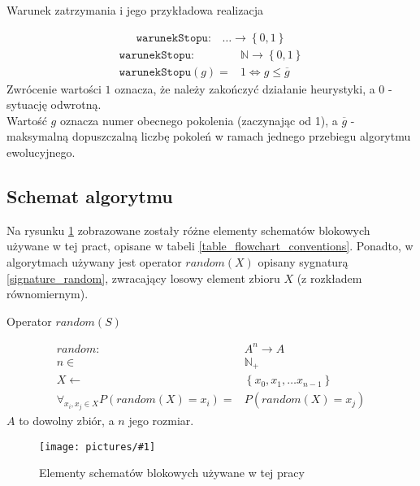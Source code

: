 \documentclass[twoside]{iisthesis}
\newcommand{\numberSet}{\mathbb}
\newcommand{\param}{\mathtt}
\newcommand{\img}[1]{\texttt{[image: pictures/\#1]}}
\begin{document}
\begin{signature}
	\caption{Warunek zatrzymania i jego przykładowa realizacja \label{signature_stop}} 
	\begin{align}
		\label{stop_general}
		\param{warunekStopu}: &\ldots \rightarrow \left\{ 0, 1 \right\}
	\end{align}
	\begin{align}
		\label{stop_maxGen}
		\param{warunekStopu}: &\numberSet{N} \rightarrow \left\{ 0, 1 \right\} \\
		\param{warunekStopu}(g) = &1 \Leftrightarrow g \leq \overline{g}
	\end{align}
	Zwrócenie wartości $1$ oznacza, że należy zakończyć działanie heurystyki, a $0$ - sytuację odwrotną. \\ 
	Wartość $g$ oznacza numer obecnego pokolenia (zaczynając od 1), a $\overline{g}$ - maksymalną dopuszczalną liczbę pokoleń w ramach jednego przebiegu algorytmu ewolucyjnego.
\end{signature}	

\subsection{Schemat algorytmu} \label{subsection_general_ea_scheme}

Na rysunku \ref{figure_flowchart_conventions} zobrazowane zostały różne elementy schematów blokowych używane w tej pract, opisane w tabeli \ref{table_flowchart_conventions}. Ponadto, w algorytmach używany jest operator $random(X)$ opisany sygnaturą \ref{signature_random}, zwracający losowy element zbioru $X$ (z rozkładem równomiernym).

\begin{signature}
	\caption{Operator $random(S)$ \label{signature_random}}
	\begin{align}
	random: &A^n \rightarrow A \\
	n \in &\numberSet{N}_{+} \\
	X \gets &\left\{ x_0, x_1, \dots x_{n-1} \right\} \\
	\forall_{x_i, x_j \in X} P(random(X) = x_i) = &P(random(X) = x_j)
	\end{align}
	$A$ to dowolny zbiór, a $n$ jego rozmiar.
\end{signature}

\begin{figure}[H]
	\caption{Elementy schematów blokowych używane w tej pracy \label{figure_flowchart_conventions}}
	\img{conventions.png}
\end{figure}
\end{document}
